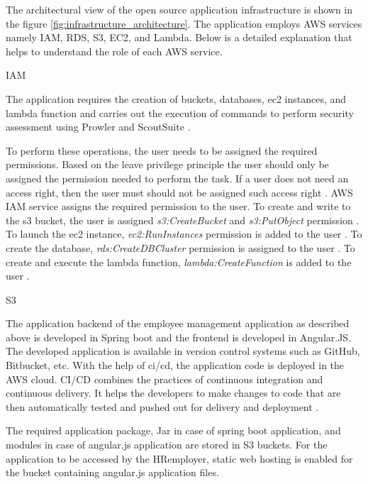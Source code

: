 \par The architectural view of the open source application infrastructure is shown in the figure
\ref{fig:infrastructure_architecture}.
The application employs AWS services namely IAM, RDS, S3, EC2, and Lambda.
Below is a detailed explanation that helps to understand the role of each AWS service.

\par IAM

\par The application requires the creation of buckets, databases, ec2 instances, and lambda function and carries out the
execution of commands to perform security assessment
using Prowler and ScoutSuite \cite{79}.

\par To perform these operations, the user needs to be assigned the required permissions.
Based on the leave privilege principle the user should only be assigned the permission needed to perform the task.
If a user does not need an access right, then the user
must should not be assigned such access right \cite{80}.
AWS IAM service assigns the required permission to the user.
To create and write to the s3 bucket, the user is
assigned \textit{s3:CreateBucket} and \textit{s3:PutObject} permission \cite{81}.
To launch the ec2 instance, \textit{ec2:RunInstances}
permission is added to the user \cite{82}.
To create the database, \textit{rds:CreateDBCluster}
permission is assigned to the user \cite{83}.
To create and execute the lambda function,
\textit{lambda:CreateFunction} is added to the user \cite{84}.
\hfill \break
\par S3

\par The application backend of the employee management application as described above is developed in Spring boot and the frontend is developed in Angular.JS. The developed application is available in version control systems such as GitHub, Bitbucket, etc.
With the help of \gls{ci}/\gls{cd}, the application code is
deployed
in the AWS cloud.
CI/CD combines the practices of continuous integration and continuous delivery.
It helps the developers to make changes to code that are
then automatically tested and pushed out for delivery and
deployment \cite{85}.

\par The required application package, Jar in case of spring boot application, and modules in case of angular.js application are stored in S3 buckets.
For the application to be accessed by the HR\/employer, static web hosting is enabled for the bucket containing angular.js application files.


